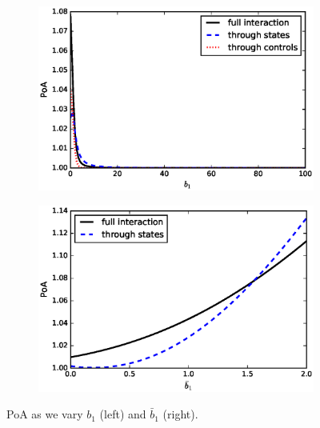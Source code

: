 \documentclass[11pt]{article}
\begin{document}
\begin{figure}[!htb]
    \centering
    \begin{subfigure}{.45\textwidth}
        \includegraphics[scale=0.5]{PoA_half_more_steps_b1_2.eps}
    \end{subfigure}
    \begin{subfigure}{.45\textwidth}
        \includegraphics[scale=0.5]{PoA_half_more_steps_b1bar.eps}
    \end{subfigure}
    \caption{PoA as we vary $b_1$ (left) and $\bar{b}_1$ (right).}
    \label{fig:b1_b1bar}
\end{figure}
\end{document}

